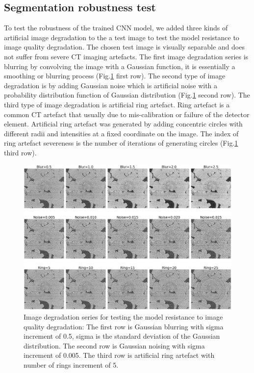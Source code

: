\documentclass[draft,linenumbers]{agujournal2018}
\begin{document}
\subsection{Segmentation robustness test}
To test the robustness of the trained CNN model, we added three kinds of artificial image degradation to the a test image to test the model resistance to image quality degradation. The chosen test image is visually separable and does not suffer from severe \textmu CT imaging artefacts. The first image degradation series is blurring by convolving the image with a Gaussian function, it is essentially a smoothing or blurring process (Fig.\ref{noisetest} first row). The second type of image degradation is by adding Gaussian noise which is artificial noise with a probability distribution function of Gaussian distribution (Fig.\ref{noisetest} second row). The third type of image degradation is artificial ring artefact. Ring artefact is a common \textmu CT artefact that usually due to mis-calibration or failure of the detector element. Artificial ring artefact was generated by adding concentric circles with different radii and intensities at a fixed coordinate on the image. The index of ring artefact severeness is the number of iterations of generating circles (Fig.\ref{noisetest} third row).

\begin{figure}[h]
 \centering
 \includegraphics[width=33pc]{imgs/01dec_noisetest3}
 \caption{Image degradation series for testing the model resistance to image quality degradation: The first row is Gaussian blurring with sigma increment of 0.5, sigma is the standard deviation of the Gaussian distribution. The second row is Gaussian noising with sigma increment of 0.005. The third row is artificial ring artefact with number of rings increment of 5.}
 \label{noisetest}
 \end{figure}
 
\end{document}
